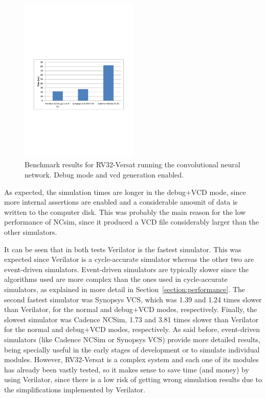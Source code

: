 \documentclass[conference]{IEEEtran}
\begin{document}
\begin{figure}[!htb]
	\centering
	\includegraphics[trim=0 250 0 290 , clip, 
	width=0.5\textwidth]{Figures/benchmark_vcd.pdf}
	\caption{Benchmark results for RV32-Versat running the convolutional neural network. 
		Debug mode and
		vcd generation enabled.}
	\label{fig:benchmark_vcd}
\end{figure}

As expected, the simulation times are longer in the debug+\ac{VCD} mode, since more 
internal assertions are enabled and a considerable amounit of data is written to the 
computer disk. This was probably the main reason for the low performance of
NCsim, since it produced a \ac{VCD} file considerably larger than the other
simulators.

It can be seen that in both tests Verilator is the fastest simulator. This was
expected since Verilator is a cycle-accurate simulator whereas the other two are
event-driven simulators. Event-driven simulators are typically slower since the
algorithms used are more complex than the ones used in cycle-accurate
simulators, as explained in more detail in Section~\ref{section:performance}. The
second fastest simulator was Synopsys VCS, which was 1.39 and 1.24 times slower
than Verilator, for the normal and debug+\ac{VCD} modes, respectively. Finally, the
slowest simulator was Cadence NCSim, 1.73 and 3.81 times slower than
Verilator for the normal and debug+\ac{VCD} modes, respectively. As said before,
event-driven simulators (like Cadence NCSim or Synopsys VCS) provide more
detailed results, being specially useful in the early stages of development or
to simulate individual modules. However, RV32-Versat is a complex system and
each one of its modules has already been vastly tested, so it makes sense to
save time (and money) by using Verilator, since there is a low risk of getting
wrong simulation results due to the simplifications implemented by Verilator.
\end{document}
